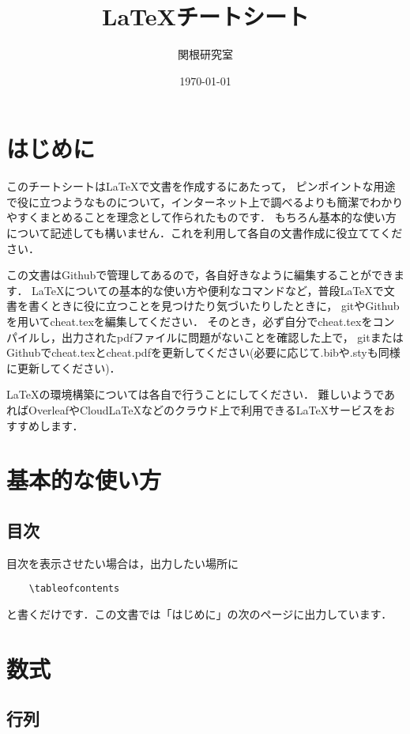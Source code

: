\documentclass[a4paper,11pt]{jsreport}
\numberwithin{equation}{section}
\theoremstyle{definition}
\begin{document}
\title{{\LaTeX}チートシート}
\author{関根研究室}
\date{\today}
\maketitle

\chapter*{はじめに}

このチートシートは{\LaTeX}で文書を作成するにあたって，
ピンポイントな用途で役に立つようなものについて，インターネット上で調べるよりも簡潔でわかりやすくまとめることを理念として作られたものです．
もちろん基本的な使い方について記述しても構いません．これを利用して各自の文書作成に役立ててください．

この文書はGithubで管理してあるので，各自好きなように編集することができます．
{\LaTeX}についての基本的な使い方や便利なコマンドなど，普段{\LaTeX}で文書を書くときに役に立つことを見つけたり気づいたりしたときに，
gitやGithubを用いてcheat.texを編集してください．
そのとき，必ず自分でcheat.texをコンパイルし，出力されたpdfファイルに問題がないことを確認した上で，
gitまたはGithubでcheat.texとcheat.pdfを更新してください(必要に応じて.bibや.styも同様に更新してください)．

{\LaTeX}の環境構築については各自で行うことにしてください．
難しいようであればOverleafやCloudLaTeXなどのクラウド上で利用できる{\LaTeX}サービスをおすすめします．

\tableofcontents

\chapter{基本的な使い方}

\section{目次}

目次を表示させたい場合は，出力したい場所に
\begin{verbatim}
    \tableofcontents
\end{verbatim}
と書くだけです．この文書では「はじめに」の次のページに出力しています．

\chapter{数式}

\section{行列}
\end{document}
